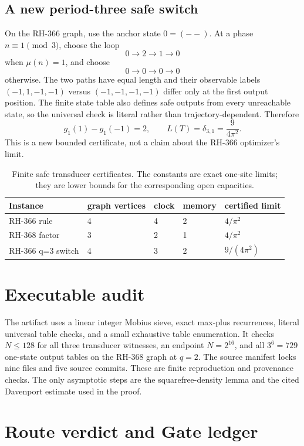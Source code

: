 \documentclass[11pt]{article}
\theoremstyle{definition}
\theoremstyle{remark}
\newcommand{\Mob}{\mu}
\begin{document}
\subsection{A new period-three safe switch}
On the RH-366 graph, use the anchor state \(0=(--)\).  At a phase
\(n\equiv1\pmod3\), choose the loop
\[
 0\to2\to1\to0
\]
when \(\Mob(n)=1\), and choose
\[
 0\to0\to0\to0
\]
otherwise.  The two paths have equal length and their observable labels
\((-1,1,-1,-1)\) versus \((-1,-1,-1,-1)\) differ only at the first output
position.  The finite state table also defines safe outputs from every
unreachable state, so the universal check is literal rather than
trajectory-dependent.  Therefore
\[
 g_1(1)-g_1(-1)=2,
 \qquad L(T)=\delta_{3,1}=\frac9{4\pi^2}.
\]
This is a new bounded certificate, not a claim about the RH-366 optimizer's
limit.

\begin{table}[t]
\centering
\small
\begin{tabular}{@{}lllll@{}}
\toprule
Instance & graph vertices & clock & memory & certified limit \\
\midrule
RH-366 rule & 4 & 4 & 2 & $4/\pi^2$ \\
RH-368 factor & 3 & 2 & 1 & $4/\pi^2$ \\
RH-366 q=3 switch & 4 & 3 & 2 & $9/(4\pi^2)$ \\
\bottomrule
\end{tabular}
\caption{Finite safe transducer certificates.  The constants are exact
one-site limits; they are lower bounds for the corresponding open capacities.}
\label{tab:instances}
\end{table}

\section{Executable audit}

The artifact uses a linear integer Mobius sieve, exact max-plus recurrences,
literal universal table checks, and a small exhaustive table enumeration.
It checks \(N\leq128\) for all three transducer witnesses, an endpoint
\(N=2^{16}\), and all \(3^6=729\) one-state output tables on the RH-368
graph at \(q=2\).  The source manifest locks nine files and five source
commits.  These are finite reproduction and provenance checks.  The only
asymptotic steps are the squarefree-density lemma and the cited Davenport
estimate used in the proof.

\section{Route verdict and Gate ledger}
\end{document}
